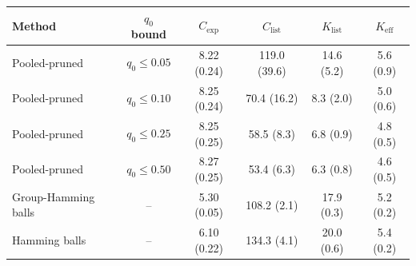 \begin{tabular}{lccccc}
\toprule
Method & $q_0$ bound & $C_{\mathrm{exp}}$ & $C_{\mathrm{list}}$ & $K_{\mathrm{list}}$ & $K_{\mathrm{eff}}$ \\
\midrule
Pooled-pruned & $q_0\le0.05$ & 8.22 (0.24) & 119.0 (39.6) & 14.6 (5.2) & 5.6 (0.9) \\
Pooled-pruned & $q_0\le0.10$ & 8.25 (0.24) & 70.4 (16.2) & 8.3 (2.0) & 5.0 (0.6) \\
Pooled-pruned & $q_0\le0.25$ & 8.25 (0.25) & 58.5 (8.3) & 6.8 (0.9) & 4.8 (0.5) \\
Pooled-pruned & $q_0\le0.50$ & 8.27 (0.25) & 53.4 (6.3) & 6.3 (0.8) & 4.6 (0.5) \\
Group-Hamming balls & -- & 5.30 (0.05) & 108.2 (2.1) & 17.9 (0.3) & 5.2 (0.2) \\
Hamming balls & -- & 6.10 (0.22) & 134.3 (4.1) & 20.0 (0.6) & 5.4 (0.2) \\
\bottomrule
\end{tabular}
